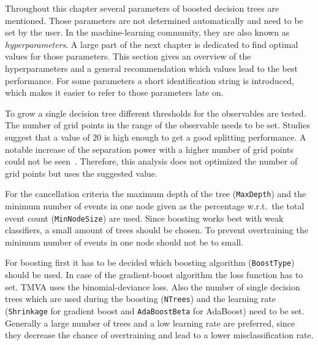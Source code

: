 Throughout this chapter several parameters of boosted decision trees are mentioned.
Those parameters are not determined automatically and need to be set by the user.
In the machine-learning community, they are also known as \emph{hyperparameters}.
A large part of the next chapter is dedicated to find optimal values for those parameters.
This section gives an overview of the hyperparameters and a general recommendation which values lead to the best
performance.
For some parameters a short identification string is introduced, which makes it easier to refer to
those parameters late on.

To grow a single decision tree different thresholds for the observables are tested.
The number of grid points in the range of the observable needs to be set.
Studies suggest that a value of $20$ is high enough to get a good splitting performance.
A notable increase of the separation power with a higher number of grid points could not be seen~\cite{TMVA}.
Therefore, this analysis does not optimized the number of grid points but uses the suggested value.

For the cancellation criteria the maximum depth of the tree (\texttt{MaxDepth}) and the minimum number of events in one node
given as the percentage w.r.t.\ the total event count (\texttt{MinNodeSize}) are used.
Since boosting works best with weak classifiers, a small amount of trees should be chosen.
To prevent overtraining the minimum number of events in one node should not be to small.

For boosting first it has to be decided which boosting algorithm (\texttt{BoostType}) should be used.
In case of the gradient-boost algorithm the loss function has to set.
TMVA uses the binomial-deviance loss.
Also the number of single decision trees which are used during the boosting (\texttt{NTrees}) and the
learning rate (\texttt{Shrinkage} for gradient boost and \texttt{AdaBoostBeta} for AdaBoost) need to be set.
Generally a large number of trees and a low learning rate are preferred, since they decrease the chance of overtraining
and lead to a lower misclassification rate.
